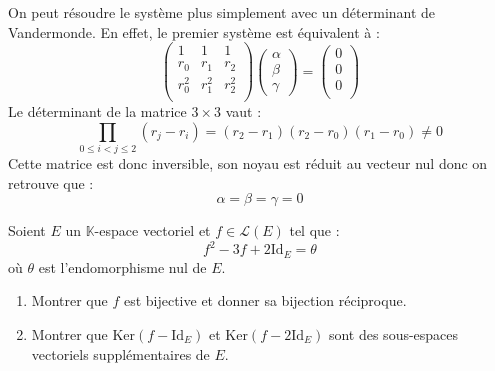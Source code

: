 \documentclass[a4paper,10pt]{report}
\begin{document}
\begin{enumerate}
\medskip

\noindent On peut résoudre le système plus simplement avec un déterminant de Vandermonde. En effet, le premier système est équivalent à :
$$ \begin{pmatrix}
1 & 1 & 1 \\
r_0 & r_1 & r_2 \\
r_0^2 & r_1^2 & r_2^2 \\
\end{pmatrix} \begin{pmatrix}
\alpha \\
\beta \\
\gamma
\end{pmatrix} = \begin{pmatrix}
0 \\
0 \\
0 \\
\end{pmatrix}$$ 
Le déterminant de la matrice $3 \times 3$ vaut :
$$ \prod_{0 \leq i <j \leq 2} (r_j-r_i) = (r_2-r_1)(r_2-r_0)(r_1-r_0) \neq 0$$
Cette matrice est donc inversible, son noyau est réduit au vecteur nul donc on retrouve que :
$$ \alpha = \beta = \gamma = 0$$
\end{enumerate}


\medskip


\begin{Exercice}{} Soient $E$ un $\mathbb{K}$-espace vectoriel et $f \in \mathcal{L}(E)$ tel que :
    \[
    f^2 - 3f + 2 \textrm{Id}_E = \theta
    \]
où $\theta$ est l'endomorphisme nul de $E$.
    \begin{enumerate}
      \item Montrer que $f$ est bijective et donner sa bijection réciproque.
      \item Montrer que $\textrm{Ker}(f - \textrm{Id}_E)$ et $\textrm{Ker}(f - 2\textrm{Id}_E)$ sont des sous-espaces vectoriels supplémentaires de $E$.
    \end{enumerate}
\end{Exercice}

\corr 
\end{document}
